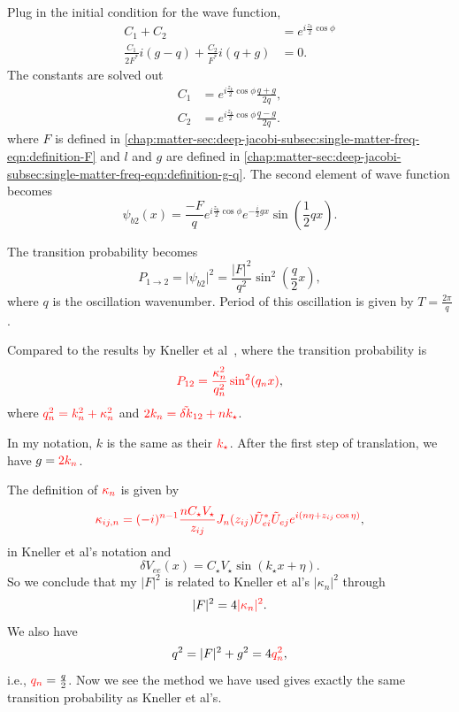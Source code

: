 Plug in the initial condition for the wave function,
\begin{align}
   C_1 + C_2 &= e^{i \frac{z_k}{2}\cos \phi} \\
   \frac{C_1}{2F^ * } i \left( g - q \right) + \frac{C _ 2}{ F ^ *} i \left( q + g  \right) & = 0.
\end{align}
The constants are solved out
\begin{align}
   C_1 &= e^{i \frac{z_k}{2}\cos \phi} \frac{q + g }{2 q} , \\
   C_2 &= e^{i \frac{z_k}{2}\cos \phi} \frac{ q - g }{2 q}.
\end{align}
where $F$ is defined in \ref{chap:matter-sec:deep-jacobi-subsec:single-matter-freq-eqn:definition-F} and $l$ and $g$ are defined in \ref{chap:matter-sec:deep-jacobi-subsec:single-matter-freq-eqn:definition-g-q}.
The second element of wave function becomes
\begin{equation}
   \psi_{b2}(x) = \frac{- F}{ q } e^{i\frac{z_k}{2} \cos\phi} e^{- \frac{i}{2}gx} \sin \left( \frac{1}{2} q x \right).
\end{equation}

The transition probability becomes
\begin{equation}
   P_{1\to 2} = \lvert \psi_{b2} \rvert^2 = \frac{\lvert F \rvert^2}{q^2} \sin^2\left( \frac{ q }{2} x \right),
\end{equation}
where $q$ is the oscillation wavenumber. Period of this oscillation is given by $T = \frac{2\pi}{q}$.

Compared to the results by Kneller et al~\cite{Kneller2013}, where the transition probability is
\begin{equation}
    {\color{red}P_{12} = \frac{\kappa_n^2}{q_n^2} \sin^2 (q_n x)},
\end{equation}
where $\color{red}q_n^2 = k_n^2 + \kappa_n^2$ and $\color{red}2k_n = \tilde{\delta k}_{12} + n k_\star$.

In my notation, $k$ is the same as their $\color{red}k_\star$. After the first step of translation, we have $g = \color{red} 2 k_n$.

The definition of $\color{red}\kappa_n$ is given by
\begin{equation}
    {\color{red}\kappa_{ij,n} = (-i)^{n-1} \frac{n C_\star V_\star}{z_{ij}} J_n(z_{ij}) \tilde U_{ei}^* \tilde U_{ej} e^{i ( n \eta + z_{ij} \cos \eta)} },
\end{equation}
in Kneller et al's notation and
\begin{equation}
  \delta V_{ee}(x) = C_\star V_\star \sin (k_\star x + \eta).
\end{equation}
So we conclude that my $\lvert F \rvert ^2$ is related to Kneller et al's $\lvert \kappa_n \rvert^2$ through
\begin{equation}
  \lvert F \rvert^2 = 4 {\color{red} \lvert \kappa_n \rvert^2}.  
\end{equation}
We also have
\begin{equation}
  q^2 = \lvert F \rvert ^2 + g^2  = 4 {\color{red} q_n^2},  
\end{equation}
i.e., ${\color{red}q_n} = \frac{ q }{2}$.
Now we see the method we have used gives exactly the same transition probability as Kneller et al's.


